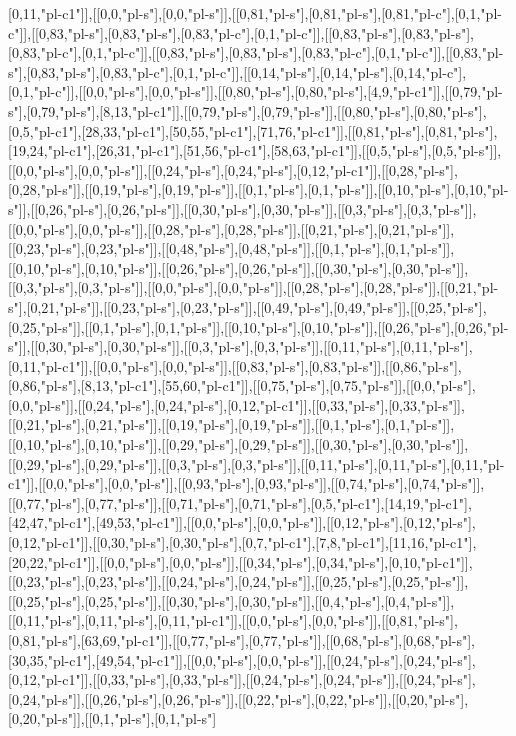 [0,11,"pl-c1"]],[[0,0,"pl-s"],[0,0,"pl-s"]],[[0,81,"pl-s"],[0,81,"pl-s"],[0,81,"pl-c"],[0,1,"pl-c"]],[[0,83,"pl-s"],[0,83,"pl-s"],[0,83,"pl-c"],[0,1,"pl-c"]],[[0,83,"pl-s"],[0,83,"pl-s"],[0,83,"pl-c"],[0,1,"pl-c"]],[[0,83,"pl-s"],[0,83,"pl-s"],[0,83,"pl-c"],[0,1,"pl-c"]],[[0,83,"pl-s"],[0,83,"pl-s"],[0,83,"pl-c"],[0,1,"pl-c"]],[[0,14,"pl-s"],[0,14,"pl-s"],[0,14,"pl-c"],[0,1,"pl-c"]],[[0,0,"pl-s"],[0,0,"pl-s"]],[[0,80,"pl-s"],[0,80,"pl-s"],[4,9,"pl-c1"]],[[0,79,"pl-s"],[0,79,"pl-s"],[8,13,"pl-c1"]],[[0,79,"pl-s"],[0,79,"pl-s"]],[[0,80,"pl-s"],[0,80,"pl-s"],[0,5,"pl-c1"],[28,33,"pl-c1"],[50,55,"pl-c1"],[71,76,"pl-c1"]],[[0,81,"pl-s"],[0,81,"pl-s"],[19,24,"pl-c1"],[26,31,"pl-c1"],[51,56,"pl-c1"],[58,63,"pl-c1"]],[[0,5,"pl-s"],[0,5,"pl-s"]],[[0,0,"pl-s"],[0,0,"pl-s"]],[[0,24,"pl-s"],[0,24,"pl-s"],[0,12,"pl-c1"]],[[0,28,"pl-s"],[0,28,"pl-s"]],[[0,19,"pl-s"],[0,19,"pl-s"]],[[0,1,"pl-s"],[0,1,"pl-s"]],[[0,10,"pl-s"],[0,10,"pl-s"]],[[0,26,"pl-s"],[0,26,"pl-s"]],[[0,30,"pl-s"],[0,30,"pl-s"]],[[0,3,"pl-s"],[0,3,"pl-s"]],[[0,0,"pl-s"],[0,0,"pl-s"]],[[0,28,"pl-s"],[0,28,"pl-s"]],[[0,21,"pl-s"],[0,21,"pl-s"]],[[0,23,"pl-s"],[0,23,"pl-s"]],[[0,48,"pl-s"],[0,48,"pl-s"]],[[0,1,"pl-s"],[0,1,"pl-s"]],[[0,10,"pl-s"],[0,10,"pl-s"]],[[0,26,"pl-s"],[0,26,"pl-s"]],[[0,30,"pl-s"],[0,30,"pl-s"]],[[0,3,"pl-s"],[0,3,"pl-s"]],[[0,0,"pl-s"],[0,0,"pl-s"]],[[0,28,"pl-s"],[0,28,"pl-s"]],[[0,21,"pl-s"],[0,21,"pl-s"]],[[0,23,"pl-s"],[0,23,"pl-s"]],[[0,49,"pl-s"],[0,49,"pl-s"]],[[0,25,"pl-s"],[0,25,"pl-s"]],[[0,1,"pl-s"],[0,1,"pl-s"]],[[0,10,"pl-s"],[0,10,"pl-s"]],[[0,26,"pl-s"],[0,26,"pl-s"]],[[0,30,"pl-s"],[0,30,"pl-s"]],[[0,3,"pl-s"],[0,3,"pl-s"]],[[0,11,"pl-s"],[0,11,"pl-s"],[0,11,"pl-c1"]],[[0,0,"pl-s"],[0,0,"pl-s"]],[[0,83,"pl-s"],[0,83,"pl-s"]],[[0,86,"pl-s"],[0,86,"pl-s"],[8,13,"pl-c1"],[55,60,"pl-c1"]],[[0,75,"pl-s"],[0,75,"pl-s"]],[[0,0,"pl-s"],[0,0,"pl-s"]],[[0,24,"pl-s"],[0,24,"pl-s"],[0,12,"pl-c1"]],[[0,33,"pl-s"],[0,33,"pl-s"]],[[0,21,"pl-s"],[0,21,"pl-s"]],[[0,19,"pl-s"],[0,19,"pl-s"]],[[0,1,"pl-s"],[0,1,"pl-s"]],[[0,10,"pl-s"],[0,10,"pl-s"]],[[0,29,"pl-s"],[0,29,"pl-s"]],[[0,30,"pl-s"],[0,30,"pl-s"]],[[0,29,"pl-s"],[0,29,"pl-s"]],[[0,3,"pl-s"],[0,3,"pl-s"]],[[0,11,"pl-s"],[0,11,"pl-s"],[0,11,"pl-c1"]],[[0,0,"pl-s"],[0,0,"pl-s"]],[[0,93,"pl-s"],[0,93,"pl-s"]],[[0,74,"pl-s"],[0,74,"pl-s"]],[[0,77,"pl-s"],[0,77,"pl-s"]],[[0,71,"pl-s"],[0,71,"pl-s"],[0,5,"pl-c1"],[14,19,"pl-c1"],[42,47,"pl-c1"],[49,53,"pl-c1"]],[[0,0,"pl-s"],[0,0,"pl-s"]],[[0,12,"pl-s"],[0,12,"pl-s"],[0,12,"pl-c1"]],[[0,30,"pl-s"],[0,30,"pl-s"],[0,7,"pl-c1"],[7,8,"pl-c1"],[11,16,"pl-c1"],[20,22,"pl-c1"]],[[0,0,"pl-s"],[0,0,"pl-s"]],[[0,34,"pl-s"],[0,34,"pl-s"],[0,10,"pl-c1"]],[[0,23,"pl-s"],[0,23,"pl-s"]],[[0,24,"pl-s"],[0,24,"pl-s"]],[[0,25,"pl-s"],[0,25,"pl-s"]],[[0,25,"pl-s"],[0,25,"pl-s"]],[[0,30,"pl-s"],[0,30,"pl-s"]],[[0,4,"pl-s"],[0,4,"pl-s"]],[[0,11,"pl-s"],[0,11,"pl-s"],[0,11,"pl-c1"]],[[0,0,"pl-s"],[0,0,"pl-s"]],[[0,81,"pl-s"],[0,81,"pl-s"],[63,69,"pl-c1"]],[[0,77,"pl-s"],[0,77,"pl-s"]],[[0,68,"pl-s"],[0,68,"pl-s"],[30,35,"pl-c1"],[49,54,"pl-c1"]],[[0,0,"pl-s"],[0,0,"pl-s"]],[[0,24,"pl-s"],[0,24,"pl-s"],[0,12,"pl-c1"]],[[0,33,"pl-s"],[0,33,"pl-s"]],[[0,24,"pl-s"],[0,24,"pl-s"]],[[0,24,"pl-s"],[0,24,"pl-s"]],[[0,26,"pl-s"],[0,26,"pl-s"]],[[0,22,"pl-s"],[0,22,"pl-s"]],[[0,20,"pl-s"],[0,20,"pl-s"]],[[0,1,"pl-s"],[0,1,"pl-s"]